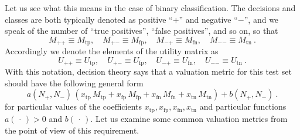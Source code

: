 \documentclass[\ifafour a4paper,12pt,\else a5paper,10pt,\fi%
onecolumn,oneside,article,%
british%
]{memoir}
\theoremstyle{remark}
\theoremstyle{innote}
\newcommand*{\dotv}{\mathord{\,\cdot\,}}%
\renewcommand*{\|}[1][]{\nonscript\:#1\vert\nonscript\:\mathopen{}}
\newcommand*{\Po}{\mathord{+}}
\newcommand*{\Ne}{\mathord{-}}
\newcommand*{\tp}{\textrm{tp}}
\newcommand*{\fp}{\textrm{fp}}
\newcommand*{\fn}{\textrm{fn}}
\newcommand*{\tn}{\textrm{tn}}
\begin{document}
Let us see what this means in the case of binary classification. The decisions and classes are both typically denoted as positive \enquote{$\Po$} and negative \enquote{$\Ne$}, and we speak of the number of \enquote{true positives}, \enquote{false positives}, and so on, so that
\begin{equation*}
  M_{\Po\Po} \equiv M_{\tp}, \quad
  M_{\Po\Ne} \equiv M_{\fp}, \quad
  M_{\Ne\Po} \equiv M_{\fn}, \quad
  M_{\Ne\Ne} \equiv M_{\tn} \ .
\end{equation*}
Accordingly we denote the elements of the utility matrix as
\begin{equation*}
  U_{\Po\Po} \equiv U_{\tp}, \quad
  U_{\Po\Ne} \equiv U_{\fp}, \quad
  U_{\Ne\Po} \equiv U_{\fn}, \quad
  U_{\Ne\Ne} \equiv U_{\tn} \ .
\end{equation*}
With this notation, decision theory says that a valuation metric for this test set should have the following general form
\begin{equation}
  \label{eq:utility_testset_binary}
  a(N_{\Po},N_{\Ne})\,
  (x_{\tp}\, M_{\tp} + x_{\fp}\, M_{\fp} +
 x_{\fn}\, M_{\fn} + x_{\tn}\, M_{\tn}) +
  b(N_{\Po},N_{\Ne}) \ .
\end{equation}
for particular values of the coefficients $x_{\tp}, x_{\fp}, x_{\fn}, x_{\tn}$ and particular functions $a(\dotv)>0$ and $b(\dotv)$. Let us examine some common valuation metrics from the point of view of this requirement.
\end{document}
